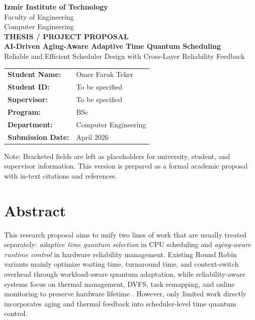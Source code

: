 \documentclass[12pt,a4paper]{article}
\begin{document}
\begin{titlepage}
\begin{center}
{\Large \textbf{Izmir Institute of Technology}}\\[0.8em]
{\large Faculty of Engineering}\\
{\large Computer Engineering}\\[2.5em]

{\LARGE \textbf{THESIS / PROJECT PROPOSAL}}\\[1.0em]
{\Large \textbf{AI-Driven Aging-Aware Adaptive Time Quantum Scheduling}}\\[0.4em]
{\large Reliable and Efficient Scheduler Design with Cross-Layer Reliability Feedback}\\[2.0em]

\begin{tabular}{>{\bfseries}p{4.8cm}p{8.8cm}}
Student Name: & Omer Faruk Teker \\
Student ID: & To be specified \\
Supervisor: & To be specified \\
Program: & BSc \\
Department: & Computer Engineering \\
Submission Date: & April 2026 \\
\end{tabular}

\vfill
\begin{minipage}{0.92\textwidth}
\small
Note: Bracketed fields are left as placeholders for university, student, and supervisor information.
This version is prepared as a formal academic proposal with in-text citations and references.
\end{minipage}
\end{center}
\end{titlepage}

\tableofcontents
\newpage

\section*{Abstract}

This research proposal aims to unify two lines of work that are usually treated separately:
\textit{adaptive time quantum selection} in CPU scheduling and \textit{aging-aware runtime control}
in hardware reliability management. Existing Round Robin variants mainly optimize waiting time,
turnaround time, and context-switch overhead through workload-aware quantum adaptation, while
reliability-aware systems focus on thermal management, DVFS, task remapping, and online monitoring
to preserve hardware lifetime \cite{behera2010,noon2011,marr2022,srinivasan2004,kumar2011}.
However, only limited work directly incorporates aging and thermal feedback into scheduler-level
time quantum control.
\end{document}
